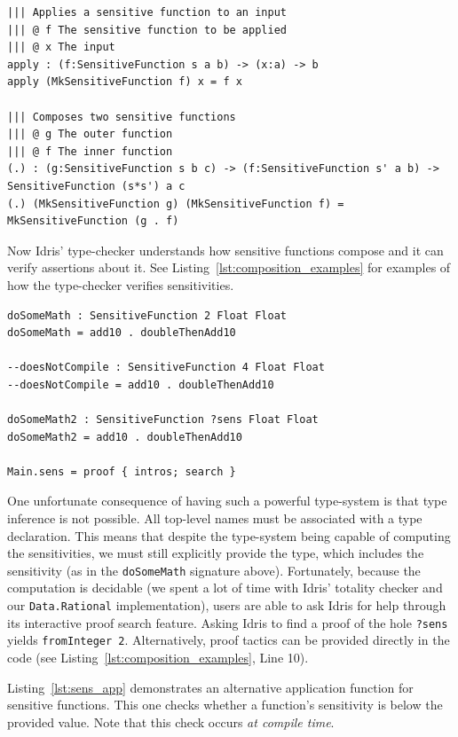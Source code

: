 \documentclass[12pt]{report}
\begin{document}
\begin{lstlisting}[float,caption={Sensitive function operations},label={lst:sens_fns_ops}]
||| Applies a sensitive function to an input
||| @ f The sensitive function to be applied
||| @ x The input
apply : (f:SensitiveFunction s a b) -> (x:a) -> b
apply (MkSensitiveFunction f) x = f x

||| Composes two sensitive functions
||| @ g The outer function
||| @ f The inner function
(.) : (g:SensitiveFunction s b c) -> (f:SensitiveFunction s' a b) -> SensitiveFunction (s*s') a c
(.) (MkSensitiveFunction g) (MkSensitiveFunction f) = MkSensitiveFunction (g . f)
\end{lstlisting}

Now Idris' type-checker understands how sensitive functions compose and it can verify assertions about it.
See Listing~\ref{lst:composition_examples} for examples of how the type-checker verifies sensitivities.

\begin{lstlisting}[float,caption={Examples of Sensitive Function Composition},label={lst:composition_examples}]
doSomeMath : SensitiveFunction 2 Float Float
doSomeMath = add10 . doubleThenAdd10

--doesNotCompile : SensitiveFunction 4 Float Float
--doesNotCompile = add10 . doubleThenAdd10

doSomeMath2 : SensitiveFunction ?sens Float Float
doSomeMath2 = add10 . doubleThenAdd10

Main.sens = proof { intros; search }
\end{lstlisting}

One unfortunate consequence of having such a powerful type-system is that type inference is not possible.
All top-level names must be associated with a type declaration.
This means that despite the type-system being capable of computing the sensitivities, we must still explicitly provide the type, which includes the sensitivity (as in the \texttt{doSomeMath} signature above).
Fortunately, because the computation is decidable (we spent a lot of time with Idris' totality checker and our \texttt{Data.Rational} implementation), users are able to ask Idris for help through its interactive proof search feature.
Asking Idris to find a proof of the hole \texttt{?sens} yields \texttt{fromInteger 2}.
Alternatively, proof tactics can be provided directly in the code (see Listing~\ref{lst:composition_examples}, Line 10).

Listing~\ref{lst:sens_app} demonstrates an alternative application function for sensitive functions.
This one checks whether a function's sensitivity is below the provided value.
Note that this check occurs \textit{at compile time}.
\end{document}
